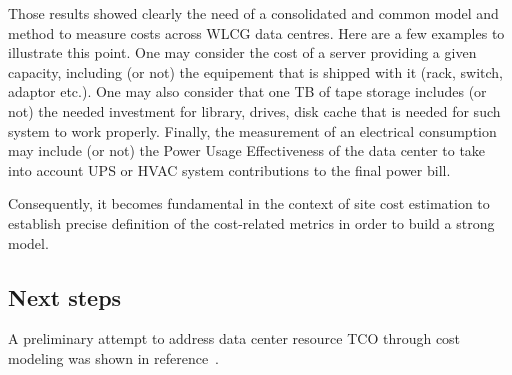 Those results showed clearly the need of a consolidated and common model and method to measure costs across
WLCG data centres.
Here are a few examples to illustrate this point. One may consider the cost of a server providing a given capacity,
including (or not) the equipement that is shipped with it (rack, switch, adaptor etc.).
One may also consider that one TB of tape storage includes (or not) the needed investment for library, drives, disk cache
that is needed for such system to work properly.
Finally, the measurement of an electrical consumption may include (or not) the Power Usage Effectiveness of the data center
to take into account UPS or HVAC system contributions to the final power bill.

Consequently, it becomes fundamental in the context of site cost
estimation to establish precise definition of the cost-related metrics in order to build a strong model.

\subsection{Next steps}

A preliminary attempt to address data center resource TCO through cost modeling was shown in reference~\cite{costmodel}.
